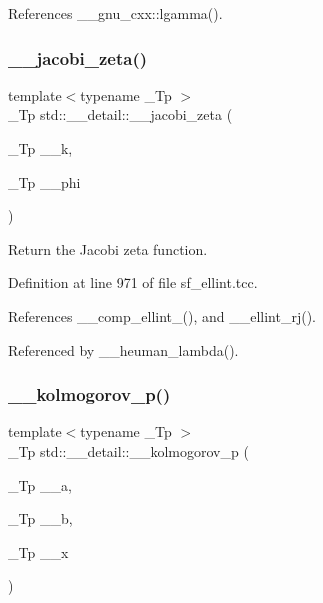 References \+\_\+\+\_\+gnu\+\_\+cxx\+::lgamma().

\mbox{\label{namespacestd_1_1____detail_a1d5fc69202703d72974c4370fd7ade03}} 
\subsubsection{\texorpdfstring{\+\_\+\+\_\+jacobi\+\_\+zeta()}{\_\_jacobi\_zeta()}}
{\footnotesize\ttfamily template$<$typename \+\_\+\+Tp $>$ \\
\+\_\+\+Tp std\+::\+\_\+\+\_\+detail\+::\+\_\+\+\_\+jacobi\+\_\+zeta (\begin{DoxyParamCaption}\item[{\+\_\+\+Tp}]{\+\_\+\+\_\+k,  }\item[{\+\_\+\+Tp}]{\+\_\+\+\_\+phi }\end{DoxyParamCaption})}

Return the Jacobi zeta function. 

Definition at line 971 of file sf\+\_\+ellint.\+tcc.



References \+\_\+\+\_\+comp\+\_\+ellint\+\_(), and \+\_\+\+\_\+ellint\+\_\+rj().



Referenced by \+\_\+\+\_\+heuman\+\_\+lambda().

\mbox{\label{namespacestd_1_1____detail_a826af8d14ad1914733d751cbb4561957}} 
\subsubsection{\texorpdfstring{\+\_\+\+\_\+kolmogorov\+\_\+p()}{\_\_kolmogorov\_p()}}
{\footnotesize\ttfamily template$<$typename \+\_\+\+Tp $>$ \\
\+\_\+\+Tp std\+::\+\_\+\+\_\+detail\+::\+\_\+\+\_\+kolmogorov\+\_\+p (\begin{DoxyParamCaption}\item[{\+\_\+\+Tp}]{\+\_\+\+\_\+a,  }\item[{\+\_\+\+Tp}]{\+\_\+\+\_\+b,  }\item[{\+\_\+\+Tp}]{\+\_\+\+\_\+x }\end{DoxyParamCaption})}

